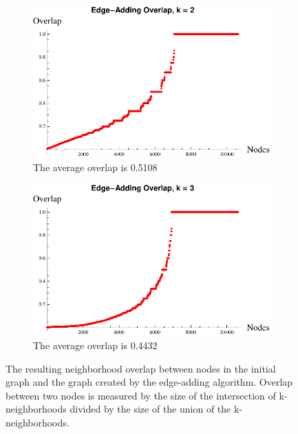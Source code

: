 \begin{figure}[htb]
\centering
\begin{subfigure}{0.5\textwidth}
	\centering
	\includegraphics[width=1\linewidth]{s40_k_2_edge_add_overlap.pdf}
	\caption{The average overlap is 0.5108 }
	\label{fig:edge-adding overlap k=2}
\end{subfigure}%
\begin{subfigure}{0.5\textwidth}
	\centering
	\includegraphics[width=1\linewidth]{s40_k_3_edge_add_overlap.pdf}
	\caption{The average overlap is 0.4432 }
	\label{fig:edge-adding overlap k=3}
\end{subfigure}%
\caption{The resulting neighborhood overlap between nodes in the initial graph and the graph created by the edge-adding algorithm. Overlap between two nodes is measured by the size of the intersection of k-neighborhoods divided by the size of the union of the k-neighborhoods. }
\end{figure}
%
